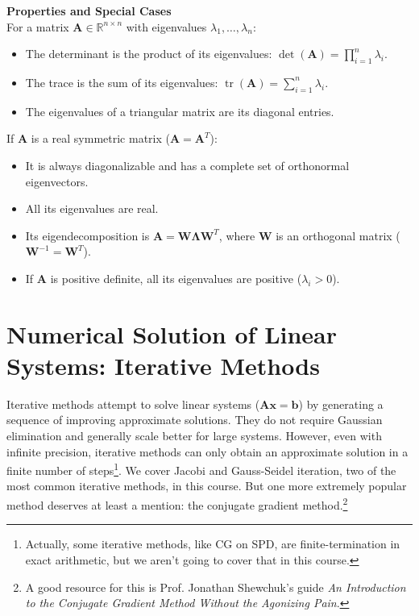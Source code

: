 \begin{theoremBox}
    \textbf{Properties and Special Cases} \\
    For a matrix $\mathbf{A} \in \mathbb{R}^{n \times n}$ with eigenvalues $\lambda_1, \dots, \lambda_n$:
    \begin{itemize}
        \item The determinant is the product of its eigenvalues: $\det(\mathbf{A}) = \prod_{i=1}^n \lambda_i$.
        \item The trace is the sum of its eigenvalues: $\operatorname{tr}(\mathbf{A}) = \sum_{i=1}^n \lambda_i$.
        \item The eigenvalues of a triangular matrix are its diagonal entries.
    \end{itemize}
    If $\mathbf{A}$ is a real symmetric matrix ($\mathbf{A} = \mathbf{A}^T$):
    \begin{itemize}
        \item It is always diagonalizable and has a complete set of orthonormal eigenvectors.
        \item All its eigenvalues are real.
        \item Its eigendecomposition is $\mathbf{A} = \mathbf{W} \mathbf{\Lambda} \mathbf{W}^T$, where $\mathbf{W}$ is an orthogonal matrix ($\mathbf{W}^{-1} = \mathbf{W}^T$).
        \item If $\mathbf{A}$ is positive definite, all its eigenvalues are positive ($\lambda_i > 0$).
    \end{itemize}
\end{theoremBox}


\section{Numerical Solution of Linear Systems: Iterative Methods}
\label{sec:num_sol_linear_iterative}
Iterative methods attempt to solve linear systems ($\mathbf{A}\mathbf{x} = \mathbf{b}$) by generating a sequence of improving approximate solutions. They do not require Gaussian elimination and generally scale better for large systems. However, even with infinite precision, iterative methods can only obtain an approximate solution in a finite number of steps\footnote{Actually, some iterative methods, like CG on SPD, are finite-termination in exact arithmetic, but we aren't going to cover that in this course.}. We cover Jacobi and Gauss-Seidel iteration, two of the most common iterative methods, in this course. But one more extremely popular method deserves at least a mention: the conjugate gradient method.\footnote{A good resource for this is Prof. Jonathan Shewchuk's guide \textit{An Introduction to the Conjugate Gradient Method Without the Agonizing Pain}.\autocite{shewchuk1994}}

